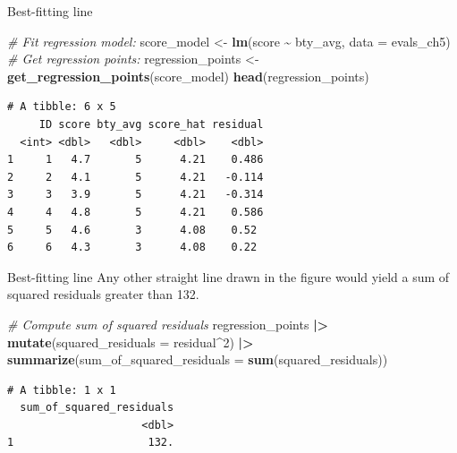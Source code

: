 \documentclass[
  ignorenonframetext,
]{beamer}
\newenvironment{Shaded}{\begin{snugshade}}{\end{snugshade}}
\newcommand{\AttributeTok}[1]{\textcolor[rgb]{0.13,0.29,0.53}{#1}}
\newcommand{\CommentTok}[1]{\textcolor[rgb]{0.56,0.35,0.01}{\textit{#1}}}
\newcommand{\DecValTok}[1]{\textcolor[rgb]{0.00,0.00,0.81}{#1}}
\newcommand{\FunctionTok}[1]{\textcolor[rgb]{0.13,0.29,0.53}{\textbf{#1}}}
\newcommand{\NormalTok}[1]{#1}
\newcommand{\OtherTok}[1]{\textcolor[rgb]{0.56,0.35,0.01}{#1}}
\newcommand{\SpecialCharTok}[1]{\textcolor[rgb]{0.81,0.36,0.00}{\textbf{#1}}}
\begin{document}
\begin{frame}[fragile]{Best-fitting line}
\label{best-fitting-line-2}
\normalsize

\begin{Shaded}
\begin{Highlighting}[]
\CommentTok{\# Fit regression model:}
\NormalTok{score\_model }\OtherTok{\textless{}{-}} \FunctionTok{lm}\NormalTok{(score }\SpecialCharTok{\textasciitilde{}}\NormalTok{ bty\_avg, }\AttributeTok{data =}\NormalTok{ evals\_ch5)}
\CommentTok{\# Get regression points:}
\NormalTok{regression\_points }\OtherTok{\textless{}{-}} \FunctionTok{get\_regression\_points}\NormalTok{(score\_model)}
\FunctionTok{head}\NormalTok{(regression\_points)}
\end{Highlighting}
\end{Shaded}

\begin{verbatim}
# A tibble: 6 x 5
     ID score bty_avg score_hat residual
  <int> <dbl>   <dbl>     <dbl>    <dbl>
1     1   4.7       5      4.21    0.486
2     2   4.1       5      4.21   -0.114
3     3   3.9       5      4.21   -0.314
4     4   4.8       5      4.21    0.586
5     5   4.6       3      4.08    0.52 
6     6   4.3       3      4.08    0.22 
\end{verbatim}

\normalsize
\end{frame}

\begin{frame}[fragile]{Best-fitting line}
\label{best-fitting-line-3}
Any other straight line drawn in the figure would yield a sum of squared
residuals greater than 132.

\normalsize

\begin{Shaded}
\begin{Highlighting}[]
\CommentTok{\# Compute sum of squared residuals}
\NormalTok{regression\_points }\SpecialCharTok{|\textgreater{}}
  \FunctionTok{mutate}\NormalTok{(}\AttributeTok{squared\_residuals =}\NormalTok{ residual}\SpecialCharTok{\^{}}\DecValTok{2}\NormalTok{) }\SpecialCharTok{|\textgreater{}}
  \FunctionTok{summarize}\NormalTok{(}\AttributeTok{sum\_of\_squared\_residuals =} \FunctionTok{sum}\NormalTok{(squared\_residuals))}
\end{Highlighting}
\end{Shaded}

\begin{verbatim}
# A tibble: 1 x 1
  sum_of_squared_residuals
                     <dbl>
1                     132.
\end{verbatim}

\normalsize
\end{frame}
\end{document}
